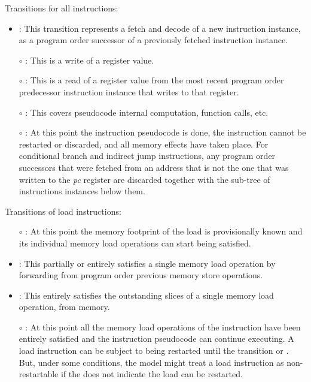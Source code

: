 \noindent Transitions for all instructions:
\begin{itemize}
\item {}: This transition represents a fetch and decode of a new instruction instance, as a program order successor of a previously fetched instruction instance.
\item[$\circ$] : This is a write of a register value.
\item[$\circ$] : This is a read of a register value from the most recent program order predecessor instruction instance that writes to that register.
\item[$\circ$] : This covers pseudocode internal computation, function calls, etc.
\item[$\circ$] : At this point the instruction pseudocode is done, the instruction cannot be restarted or discarded, and all memory effects have taken place.
For conditional branch and indirect jump instructions, any program order successors that were fetched from an address that is not the one that was written to the {\em pc} register are discarded together with the sub-tree of instructions instances below them.
\end{itemize}

\noindent Transitions of load instructions:
\begin{itemize}
\item[$\circ$] : At this point the memory footprint of the load is provisionally known and its individual memory load operations can start being satisfied.
\item {}: This partially or entirely satisfies a single memory load operation by forwarding from program order previous memory store operations.
\item {}: This entirely satisfies the outstanding slices of a single memory load operation, from memory.
\item[$\circ$] : At this point all the memory load operations of the instruction have been entirely satisfied and the instruction pseudocode can continue executing.
A load instruction can be subject to being restarted until the  transition or .
But, under some conditions, the model might treat a load instruction as non-restartable if the  does not indicate the load can be restarted.
\end{itemize}

